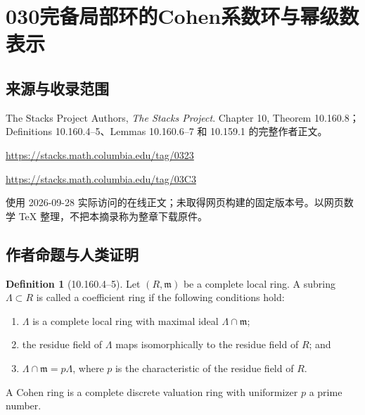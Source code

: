 \documentclass[UTF8,11pt]{ctexart}
\theoremstyle{definition}
\newtheorem*{definition}{Definition}
\begin{document}
\section*{030\quad 完备局部环的Cohen系数环与幂级数表示}
\subsection*{来源与收录范围}
The Stacks Project Authors, \emph{The Stacks Project}. Chapter 10, Theorem 10.160.8；Definitions 10.160.4--5、Lemmas 10.160.6--7 和 10.159.1 的完整作者正文。
\par\url{https://stacks.math.columbia.edu/tag/0323}
\par\url{https://stacks.math.columbia.edu/tag/03C3}
\par 使用 2026-09-28 实际访问的在线正文；未取得网页构建的固定版本号。以网页数学 TeX 整理，不把本摘录称为整章下载原件。
\subsection*{作者命题与人类证明}
\begin{definition}[10.160.4--5]
Let $(R,\mathfrak m)$ be a complete local ring. A subring $\Lambda\subset R$ is called a coefficient ring if the following conditions hold:
\begin{enumerate}
\item $\Lambda$ is a complete local ring with maximal ideal $\Lambda\cap\mathfrak m$;
\item the residue field of $\Lambda$ maps isomorphically to the residue field of $R$; and
\item $\Lambda\cap\mathfrak m=p\Lambda$, where $p$ is the characteristic of the residue field of $R$.
\end{enumerate}
A Cohen ring is a complete discrete valuation ring with uniformizer $p$ a prime number.
\end{definition}
\end{document}

